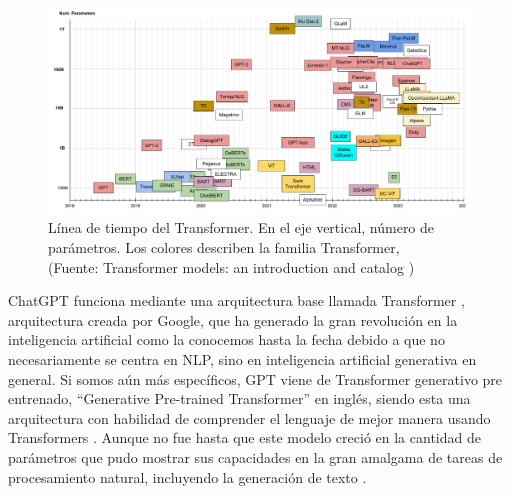 \begin{figure}[ht!]
    \centering
    \includegraphics[width=.8\textwidth]{figures/ea4.png}
    \caption[Línea de tiempo del Transformer]{Línea de tiempo del Transformer. En el eje vertical, número de parámetros.
    Los colores describen la familia Transformer,\\
    {\scriptsize (Fuente: Transformer models: an introduction and catalog \cite{eb4})}}

    \label{fig:ea3}
\end{figure}

\par ChatGPT funciona mediante una arquitectura base llamada Transformer \cite{aiayn}, arquitectura creada por Google, que ha generado 
la gran revolución en la inteligencia artificial como la conocemos hasta la fecha debido a que no necesariamente se centra en NLP, 
sino en inteligencia artificial generativa en general. Si somos aún más específicos, GPT viene de Transformer generativo 
pre entrenado, ``Generative Pre-trained Transformer'' en inglés, siendo esta una arquitectura con habilidad de comprender el 
lenguaje de mejor manera usando Transformers \cite{mt4}. Aunque no fue hasta que este modelo creció en la cantidad de parámetros que 
pudo mostrar sus capacidades en la gran amalgama de tareas de procesamiento natural, incluyendo la generación de texto \cite{mt5}.


